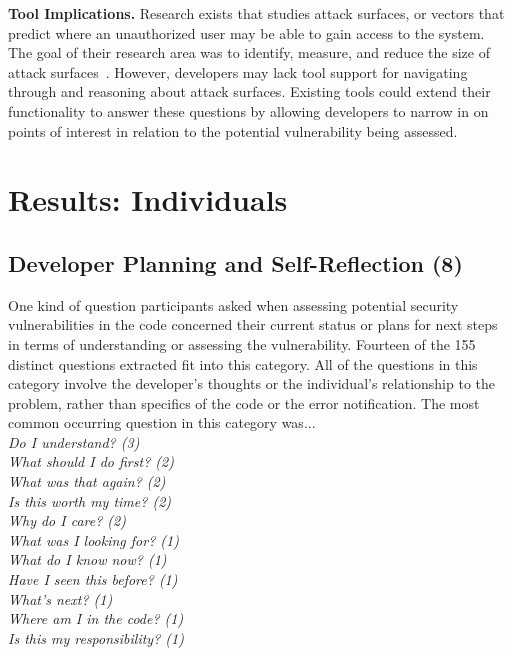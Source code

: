 \documentclass[conference]{IEEEtran}
\begin{document}
\noindent\textbf{Tool Implications.}
Research exists that studies attack surfaces, or vectors that predict where an unauthorized user may be able to gain access to the system.
The goal of their research area was to identify, measure, and reduce the size of attack surfaces~\cite{manadhata2011attack, bartel2012automatically}. 
However, developers may lack tool support for navigating through and reasoning about attack surfaces.
Existing tools could extend their functionality to answer these questions by allowing developers to narrow in on points of interest in relation to the potential vulnerability being assessed.




\section{Results: Individuals}
\label{sec:results-i}



\noindent\subsection{\textbf{Developer Planning and Self-Reflection (8)}} \label{dpr}

One kind of question participants asked when assessing potential security vulnerabilities in the code concerned their current status or plans for next steps in terms of understanding or assessing the vulnerability. 
Fourteen of the 155 distinct questions extracted fit into this category. 
All of the questions in this category involve the developer's thoughts or the individual's relationship to the problem, rather than specifics of the code or the error notification.  
The most common occurring question in this category was...
\\

\noindent\emph{Do I understand? (3)} \\
\emph{What should I do first? (2)} \\
\emph{What was that again? (2)} \\
\emph{Is this worth my time? (2)} \\
\emph{Why do I care? (2)} \\
\emph{What was I looking for? (1)} \\
\emph{What do I know now? (1)} \\
\emph{Have I seen this before? (1)} \\
\emph{What's next? (1)} \\
\emph{Where am I in the code? (1)} \\
\emph{Is this my responsibility? (1)} \\
\end{document}
